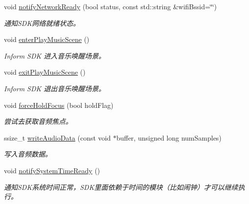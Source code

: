 \begin{DoxyCompactItemize}
void \hyperlink{classduerOSDcsSDK_1_1sdkInterfaces_1_1DcsSdk_adf2f5c84aeb4651675b4480204fd36c2}{notify\+Network\+Ready} (bool status, const std\+::string \&wifi\+Bssid=\char`\"{}\char`\"{})
\begin{DoxyCompactList}\small\item\em 通知\+S\+D\+K网络就绪状态。 \end{DoxyCompactList}\item 
\mbox{\label{classduerOSDcsSDK_1_1sdkInterfaces_1_1DcsSdk_afcd69e9c352d50a969d3951da0fe047f}} 
void \hyperlink{classduerOSDcsSDK_1_1sdkInterfaces_1_1DcsSdk_afcd69e9c352d50a969d3951da0fe047f}{enter\+Play\+Music\+Scene} ()
\begin{DoxyCompactList}\small\item\em Inform S\+DK 进入音乐唤醒场景。 \end{DoxyCompactList}\item 
\mbox{\label{classduerOSDcsSDK_1_1sdkInterfaces_1_1DcsSdk_a2d509bd1f83cf770622fd3bd5d8ee2bf}} 
void \hyperlink{classduerOSDcsSDK_1_1sdkInterfaces_1_1DcsSdk_a2d509bd1f83cf770622fd3bd5d8ee2bf}{exit\+Play\+Music\+Scene} ()
\begin{DoxyCompactList}\small\item\em Inform S\+DK 退出音乐唤醒场景。 \end{DoxyCompactList}\item 
void \hyperlink{classduerOSDcsSDK_1_1sdkInterfaces_1_1DcsSdk_aa9aba3850ac50a1328290fa93976bf1c}{force\+Hold\+Focus} (bool hold\+Flag)
\begin{DoxyCompactList}\small\item\em 尝试去获取音频焦点。 \end{DoxyCompactList}\item 
ssize\+\_\+t \hyperlink{classduerOSDcsSDK_1_1sdkInterfaces_1_1DcsSdk_aa84a60e7b59a83730f0c2b1c02b6fb0b}{write\+Audio\+Data} (const void $\ast$buffer, unsigned long num\+Samples)
\begin{DoxyCompactList}\small\item\em 写入音频数据。 \end{DoxyCompactList}\item 
\mbox{\label{classduerOSDcsSDK_1_1sdkInterfaces_1_1DcsSdk_ac8ec1f16c059652b63b90a68d2ed2857}} 
void \hyperlink{classduerOSDcsSDK_1_1sdkInterfaces_1_1DcsSdk_ac8ec1f16c059652b63b90a68d2ed2857}{notify\+System\+Time\+Ready} ()
\begin{DoxyCompactList}\small\item\em 通知\+S\+D\+K系统时间正常，\+S\+D\+K里面依赖于时间的模块（比如闹钟）才可以继续执行。 \end{DoxyCompactList}\end{DoxyCompactItemize}
